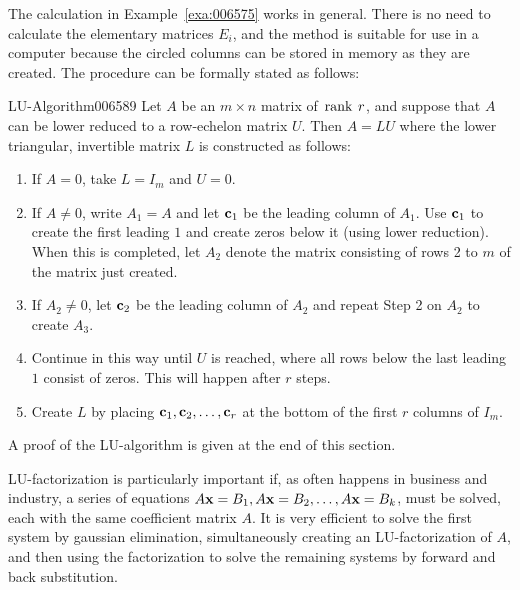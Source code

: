 The calculation in Example~\ref{exa:006575} works in general. There is no need to calculate the elementary matrices $E_{i}$, and the method is suitable for use in a computer because the circled columns can be stored in memory as they are created. The procedure can be formally stated as follows:

\begin{theorem*}{LU-Algorithm}{006589}
Let $A$ be an $m \times n$ matrix of $\thinspace\operatorname{rank \medspace}r$, and suppose that $A$ can be lower reduced to a row-echelon matrix $U$. Then $A = LU$ where the lower triangular, invertible matrix $L$ is constructed as follows:

\begin{enumerate}
\item If $A = 0$, take $L = I_{m}$ and $U = 0$.

\item If $A \neq 0$, write $A_{1} = A$ and let $\textbf{c}_{1}$ be the leading column of $A_{1}$. Use $\textbf{c}_{1}$ to create the first leading $1$ and create zeros below it (using lower reduction). When this is completed, let $A_{2}$ denote the matrix consisting of rows 2 to $m$ of the matrix just created.

\item If $A_{2} \neq 0$, let $\textbf{c}_{2}$ be the leading column of $A_{2}$ and repeat Step 2 on $A_{2}$ to create $A_{3}$.

\item Continue in this way until $U$ is reached, where all rows below the last leading $1$ consist of zeros. This will happen after $r$ steps.

\item Create $L$ by placing $\textbf{c}_{1}, \textbf{c}_{2}, \dots, \textbf{c}_{r}$ at the bottom of the first $r$ columns of $I_{m}$.

\end{enumerate}
\end{theorem*}

\noindent A proof of the LU-algorithm is given at the end of this section.

LU-factorization is particularly important if, as often happens in business and industry, a series of equations $A\textbf{x} = B_{1}, A\textbf{x} = B_{2}, \dots, A\textbf{x} = B_{k}$, must be solved, each with the same coefficient matrix $A$. It is very efficient to solve the first system by gaussian elimination, simultaneously creating an LU-factorization of $A$, and then using the factorization to solve the remaining systems by forward and back substitution.

